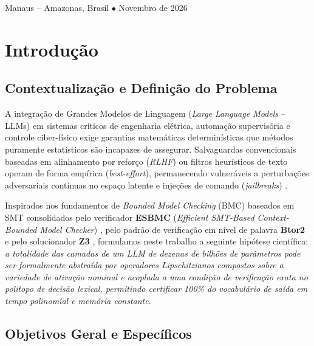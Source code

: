 \documentclass[11pt,a4paper]{article}
\theoremstyle{definition}
\begin{document}
\begin{titlepage}
    \vfill
    {\small Manaus -- Amazonas, Brasil $\bullet$ Novembro de 2026 \par}
\end{titlepage}

\newpage
\tableofcontents
\newpage

\section{Introdução}

\subsection{Contextualização e Definição do Problema}

A integração de Grandes Modelos de Linguagem (\textit{Large Language Models} -- LLMs) em sistemas críticos de engenharia elétrica, automação supervisória e controle ciber-físico exige garantias matemáticas determinísticas que métodos puramente estatísticos são incapazes de assegurar. Salvaguardas convencionais baseadas em alinhamento por reforço (\textit{RLHF}) ou filtros heurísticos de texto operam de forma empírica (\textit{best-effort}), permanecendo vulneráveis a perturbações adversariais contínuas no espaço latente e injeções de comando (\textit{jailbreaks}) \cite{gehr2018,katz2019}.

Inspirados nos fundamentos de \textit{Bounded Model Checking} (BMC) baseados em SMT consolidados pelo verificador \textbf{ESBMC} (\textit{Efficient SMT-Based Context-Bounded Model Checker}) \cite{cordeiro2012,sena2019,song2022}, pelo padrão de verificação em nível de palavra \textbf{Btor2} \cite{niemetz2018} e pelo solucionador \textbf{Z3} \cite{demoura2008}, formulamos neste trabalho a seguinte hipótese científica: \textit{a totalidade das camadas de um LLM de dezenas de bilhões de parâmetros pode ser formalmente abstraída por operadores Lipschitzianos compostos sobre a variedade de ativação nominal e acoplada a uma condição de verificação exata no politopo de decisão lexical, permitindo certificar 100\% do vocabulário de saída em tempo polinomial e memória constante}.

\subsection{Objetivos Geral e Específicos}
\end{document}
